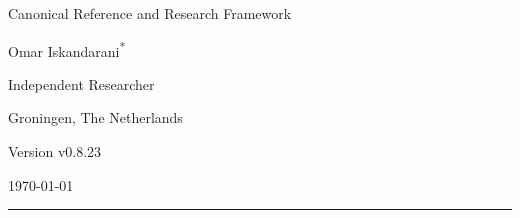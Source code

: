 \documentclass[11pt]{article}
\theoremstyle{definition}
\theoremstyle{plain}
\theoremstyle{remark}
\begin{document}
    
    \thispagestyle{empty}

    \begin{center}
        \vspace*{0.06\textheight}

        {\LARGE\bfseries \papertitle\par}
        \vspace{0.45cm}

        {\large Canonical Reference and Research Framework\par}
        \vspace{1.0cm}

        {\Large Omar Iskandarani\textsuperscript{*}\par}
        \vspace{0.35cm}

        {\normalsize Independent Researcher\par}
        {\normalsize Groningen, The Netherlands\par}
        \vspace{0.6cm}

        {\normalsize Version v0.8.23\par}
        {\normalsize \today\par}
        \vspace{0.9cm}

        \rule{0.82\textwidth}{0.5pt}
        \vspace{0.7cm}
    \end{center}

    \begin{abstract}
        \noindent
        This document presents Swirl-String Theory (SST) as a structured canonical synthesis rather than as a claim that every phenomenological sector has already been derived to theorem level. The text records the impedance--resonance and free-to-bound-mode origin of the programme; consolidates the primitive constant chain linking the effective fluid density, characteristic swirl speed, Compton anchoring, and horn/circulation scale; assigns a minimal relational link-field action as the microscopic research candidate beneath the continuum torsion bridge; records the operational special-relativity postulate that stable vortex matter constructs local spacetime with clocks, rods, and luminal R-phase torsion pulses; and organizes delay selection, atomic bridges, spectroscopy, knot-geometry certification, relational time, and topology-based mass within one explicitly stratified framework. Throughout, historical provenance, calibrated identities, SST-internal derivations, predictions, and conjectural extensions are kept distinct so that the canon remains internally coherent, externally comparable, and open to falsification.
    \end{abstract}
\end{document}
